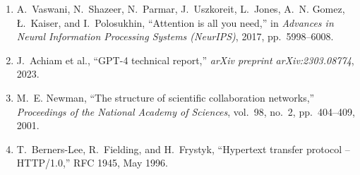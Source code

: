 \documentclass[12pt,a4paper,twoside]{article}
\begin{document}
\begin{enumerate}[leftmargin=0.5in,labelindent=0pt,labelwidth=0.25in,labelsep=0pt,
                  itemsep=2pt,parsep=0pt,topsep=0pt,partopsep=0pt,align=left]
\item A.~Vaswani, N.~Shazeer, N.~Parmar, J.~Uszkoreit, L.~Jones, A.~N. Gomez, {\L}.~Kaiser, and I.~Polosukhin, ``Attention is all you need,'' in \emph{Advances in Neural Information Processing Systems (NeurIPS)}, 2017, pp.~5998--6008.
\item J.~Achiam et al., ``GPT-4 technical report,'' \emph{arXiv preprint arXiv:2303.08774}, 2023.
\item M.~E. Newman, ``The structure of scientific collaboration networks,'' \emph{Proceedings of the National Academy of Sciences}, vol.~98, no.~2, pp.~404--409, 2001.
\item T.~Berners-Lee, R.~Fielding, and H.~Frystyk, ``Hypertext transfer protocol -- HTTP/1.0,'' RFC 1945, May 1996.
\end{enumerate}
\end{document}
